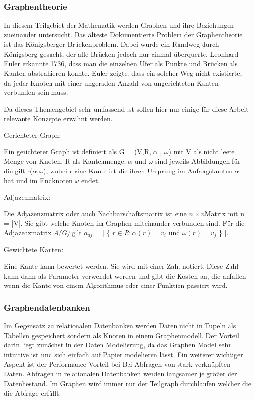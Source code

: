 	\subsubsection{Graphentheorie}
	In diesem Teilgebiet der Mathematik werden Graphen und ihre Beziehungen zueinander untersucht. Das älteste Dokumentierte Problem der Graphentheorie ist das Königsberger Brückenproblem. Dabei wurde ein Rundweg durch Königsberg gesucht, der alle Brücken jedoch nur einmal überquerte. Leonhard Euler erkannte 1736, dass man die einzelnen Ufer als Punkte und Brücken als Kanten abstrahieren konnte. Euler zeigte, dass ein solcher Weg nicht existierte, da jeder Knoten mit einer ungeraden Anzahl von ungerichteten Kanten verbunden sein muss.
	
	Da dieses Themengebiet sehr umfassend ist sollen hier nur einige für diese Arbeit relevante Konzepte erwähnt werden.
	
	Gerichteter Graph: 
	
	Ein gerichteter Graph ist definiert als G = (V,R, $\alpha$ , $\omega$) mit V als nicht leere Menge von Knoten, R als Kantenmenge.  $\alpha$ und $\omega$ sind jeweils Abbildungen für die gilt r($\alpha$,$\omega$), wobei r eine Kante ist die ihren Ursprung im Anfangsknoten $\alpha$ hat und im Endknoten $\omega$ endet.
	
	Adjazenmatrix:
	
	Die Adjazenzmatrix oder auch Nachbarschaftsmatrix ist eine  $n\times n $Matrix mit n = |V|. Sie gibt welche Knoten im Graphen miteinander verbunden sind. Für die Adjazenzmatrix \textit{A(G)} gilt $a_{aj}$ = | \{ $r \in R: \alpha(r) = v_{i}$ und $\omega(r) = v_{j} $ \} |. 
	
	Gewichtete Kanten:
	
	Eine Kante kann bewertet werden. Sie wird mit einer Zahl notiert. Diese Zahl kann dann als Parameter verwendet werden und gibt die Kosten an, die anfallen wenn die Kante von einem Algorithmus oder einer Funktion passiert wird.
	
	
	
	\subsubsection{Graphendatenbanken}	
	Im Gegensatz zu relationalen Datenbanken werden Daten nicht in Tupeln als Tabellen gespeichert sondern als Knoten in einem Graphenmodell. Der Vorteil darin liegt zunächst in der Daten Modelierung, da das Graphen Model sehr intuitive ist und sich einfach auf Papier modelieren lässt. 
	Ein weiterer wichtiger Aspekt ist der Performance Vorteil bei Bei Abfragen von stark verknüpften Daten. Abfragen in relationalen Datenbanken werden langsamer je größer der Datenbestand. Im Graphen wird immer nur der Teilgraph durchlaufen welcher die die Abfrage erfüllt.\cite[8]{robinson_webber_eifrem_2015}
	
